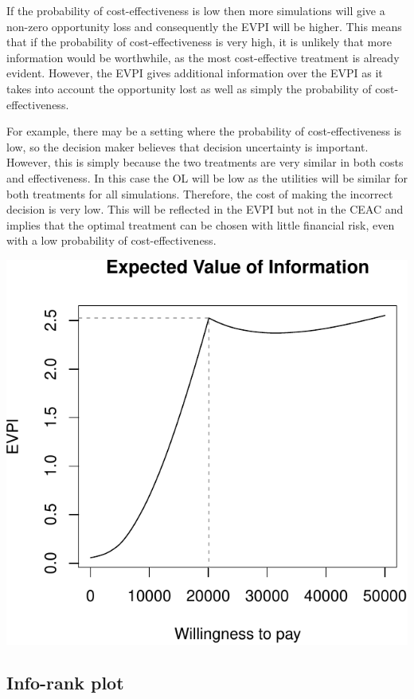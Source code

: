 \documentclass[]{article}
\begin{document}
If the probability of cost-effectiveness is low then more simulations
will give a non-zero opportunity loss and consequently the EVPI will be
higher. This means that if the probability of cost-effectiveness is very
high, it is unlikely that more information would be worthwhile, as the
most cost-effective treatment is already evident. However, the EVPI
gives additional information over the EVPI as it takes into account the
opportunity lost as well as simply the probability of
cost-effectiveness.

For example, there may be a setting where the probability of
cost-effectiveness is low, so the decision maker believes that decision
uncertainty is important. However, this is simply because the two
treatments are very similar in both costs and effectiveness. In this
case the OL will be low as the utilities will be similar for both
treatments for all simulations. Therefore, the cost of making the
incorrect decision is very low. This will be reflected in the EVPI but
not in the CEAC and implies that the optimal treatment can be chosen
with little financial risk, even with a low probability of
cost-effectiveness.

\begin{center}\includegraphics{report_files/figure-latex/unnamed-chunk-8-1} \end{center}

\hypertarget{info-rank-plot}{%
\subsection{Info-rank plot}\label{info-rank-plot}}
\end{document}
